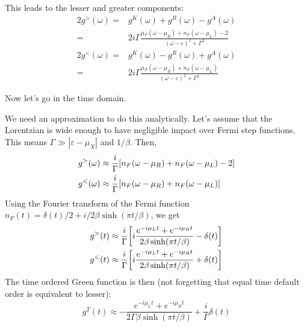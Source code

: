 \documentclass[12pt]{article}
\begin{document}
\begin{appendices}
%


This leads to the lesser and greater components:
\begin{align}
	2g^>(\omega) ={}& g^K(\omega) + g^R(\omega) - g^A(\omega)
	\\
	={}& 2i\Gamma \frac{n_F(\omega - \mu_R) + n_F(\omega - \mu_L) - 2}{(\omega - \varepsilon)^2 + \Gamma^2}
	\\
	2g^<(\omega) ={}& g^K(\omega) - g^R(\omega) + g^A(\omega)
	\\
	={}& 2i\Gamma \frac{n_F(\omega - \mu_R) + n_F(\omega - \mu_L)}{(\omega - \varepsilon)^2 + \Gamma^2}
\end{align}

Now let's go in the time domain.

We need an approximation to do this analytically. Let's assume that the Lorentzian is wide enough to have negligible impact over Fermi step functions. This means $\Gamma \gg |\varepsilon - \mu_X|$ and $1/\beta$. Then,
\begin{align}
	g^>(\omega) \approx{}& \frac{i}{\Gamma} \qty[n_F(\omega - \mu_R) + n_F(\omega - \mu_L) - 2]
	\\
	g^<(\omega) \approx{}& \frac{i}{\Gamma} \qty[n_F(\omega - \mu_R) + n_F(\omega - \mu_L)]
\end{align}
Using the Fourier transform of the Fermi function $n_F(t) = \delta(t)/2 + i/2\beta \sinh(\pi t / \beta)$, we get
\begin{align}
	g^>(t) \approx{}& \frac{i}{\Gamma} \qty[i\frac{e^{-i\mu_L t} + e^{-i\mu_R t}}{2\beta \sinh(\pi t / \beta)} - \delta(t)]
	\\
	g^<(t) \approx{}& \frac{i}{\Gamma} \qty[i\frac{e^{-i\mu_L t} + e^{-i\mu_R t}}{2\beta \sinh(\pi t / \beta)} + \delta(t)]
\end{align}
The time ordered Green function is then (not forgetting that equal time default order is equivalent to lesser):
\begin{equation}
	g^T(t) \approx - \frac{e^{-i\mu_L t} + e^{-i\mu_R t}}{2\Gamma\beta \sinh(\pi t / \beta)} + \frac{i}{\Gamma} \delta(t)
\end{equation}


\end{appendices}
\end{document}
